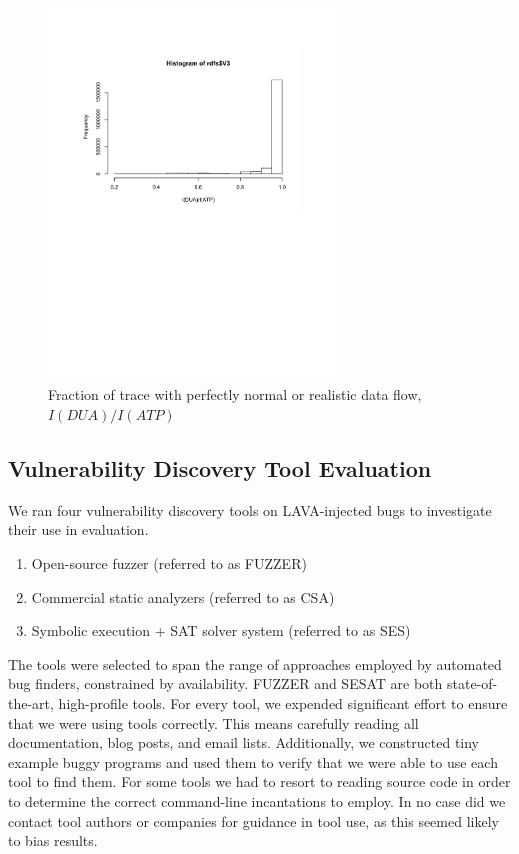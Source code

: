 \begin{figure}
\centering
\includegraphics[width=3in]{rdf.pdf}
\caption{Fraction of trace with perfectly normal or realistic data flow, $I(DUA)/I(ATP)$}
\label{fig:rdf-hist}
\end{figure}




\subsection{Vulnerability Discovery Tool Evaluation}
We ran four vulnerability discovery tools on LAVA-injected bugs to investigate their use in evaluation.
\begin{enumerate}
\item Open-source fuzzer (referred to as FUZZER)
\item Commercial static analyzers (referred to as CSA) %
\item Symbolic execution + SAT solver system (referred to as SES)
\end{enumerate}
The tools were selected to span the range of approaches employed by automated bug finders, constrained by availability.
FUZZER and SESAT are both state-of-the-art, high-profile tools. 
For every tool, we expended significant effort to ensure that we were using tools correctly.
This means carefully reading all documentation, blog posts, and email lists.
Additionally, we constructed tiny example buggy programs and used them to verify that we were able to use each tool to find them.  
For some tools we had to resort to reading source code in order to determine the correct command-line incantations to employ. 
In no case did we contact tool authors or companies for guidance in tool use, as this seemed likely to bias results.

